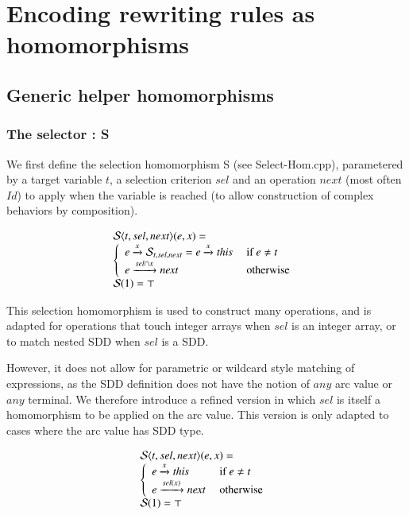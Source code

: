 \section{Encoding rewriting rules as homomorphisms}
\label{sec:hom}


\subsection{Generic helper homomorphisms}



\subsubsection{The selector : {\cal S}}

We first define the selection homomorphism {\cal S} (see Select-Hom.cpp), parametered by a target variable $t$, a selection criterion $sel$ and an operation $next$ (most often $Id$) to apply when the variable is reached (to allow construction of complex behaviors by composition).

$$
\begin{array}{lcl}
{\cal S}\langle {t,sel,next} \rangle (e,x)= \\
\left\{\begin{array}{ll}
 e \xrightarrow{\scriptstyle {x}} {\cal S}_{t,sel,next} =  e \xrightarrow{\scriptstyle {x}} \mathit{this} & \mbox{ if } e \neq t \\
 e \xrightarrow{\scriptstyle {sel \cap x}} \mathit{next} & \mbox{ otherwise } \\
\end{array}
\right. \\
 {\cal S}(1) = \top 
\end{array}
$$

This selection homomorphism is used to construct many operations, and is adapted for operations that touch integer arrays when $sel$ is an integer array, or to match nested SDD when $sel$ is a SDD.

However, it does not allow for parametric or wildcard style matching of expressions, as the SDD definition does not have the notion of $any$ arc value or $any$ terminal. We therefore introduce a refined version in which $sel$ is itself a homomorphism to be applied on the arc value. This version is only adapted to cases where the arc value has SDD type.


$$
\begin{array}{lcl}
{\cal S}\langle {t,sel,next} \rangle (e,x)= \\
\left\{\begin{array}{ll}
 e \xrightarrow{\scriptstyle {x}} \mathit{this} & \mbox{ if } e \neq t \\
 e \xrightarrow{\scriptstyle {sel (x) }} \mathit{next} & \mbox{ otherwise } \\
\end{array}
\right. \\
 {\cal S}(1) = \top 
\end{array}
$$


